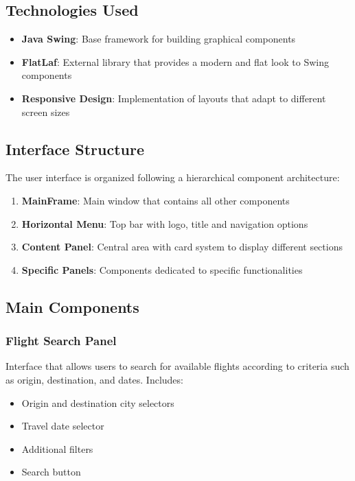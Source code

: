 \documentclass[conference]{IEEEtran}
\begin{document}
    \subsection{Technologies Used}

    \begin{itemize}
        \item \textbf{Java Swing}: Base framework for building graphical components
        \item \textbf{FlatLaf}: External library that provides a modern and flat look to Swing components
        \item \textbf{Responsive Design}: Implementation of layouts that adapt to different screen sizes
    \end{itemize}

    \subsection{Interface Structure}
    The user interface is organized following a hierarchical component architecture:

    \begin{enumerate}
        \item \textbf{MainFrame}: Main window that contains all other components
        \item \textbf{Horizontal Menu}: Top bar with logo, title and navigation options
        \item \textbf{Content Panel}: Central area with card system to display different sections
        \item \textbf{Specific Panels}: Components dedicated to specific functionalities
    \end{enumerate}

    \subsection{Main Components}

    \subsubsection{Flight Search Panel}
    Interface that allows users to search for available flights according to criteria such as origin, destination, and dates. Includes:
    \begin{itemize}
        \item Origin and destination city selectors
        \item Travel date selector
        \item Additional filters
        \item Search button
    \end{itemize}
\end{document}
